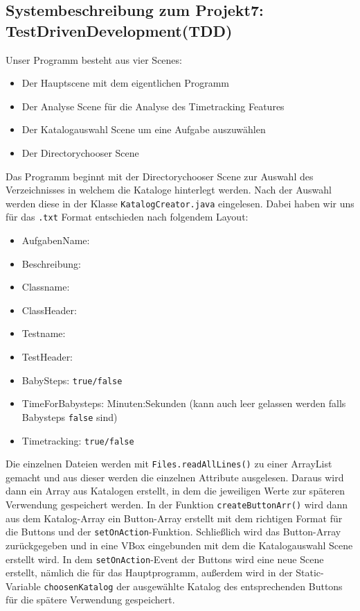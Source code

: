 \documentclass[10pt]{article}
\begin{document}
\begin{center}

\section*{Systembeschreibung zum Projekt7: TestDrivenDevelopment(TDD)}

\end{center}
\bigskip
Unser Programm besteht aus vier Scenes:
\medskip
\begin{itemize}

\item Der Hauptscene mit dem eigentlichen Programm
\item Der Analyse Scene für die Analyse des Timetracking Features
\item Der Katalogauswahl Scene um eine Aufgabe auszuwählen
\item Der Directorychooser Scene

\end{itemize}
\medskip
Das Programm beginnt mit der Directorychooser Scene zur Auswahl des Verzeichnisses in welchem die Kataloge hinterlegt werden. Nach der Auswahl werden diese in der Klasse \verb+KatalogCreator.java+ eingelesen. Dabei haben wir uns für das \verb+.txt+ Format entschieden nach folgendem Layout:
\begin{itemize}

\item[] AufgabenName:

\item[] Beschreibung:

\item[] Classname:

\item[] ClassHeader:

\item[] Testname:

\item[] TestHeader:

\item[]BabySteps: \verb+true/false+
\item[] TimeForBabysteps: Minuten:Sekunden (kann auch leer gelassen werden falls Babysteps \verb+false+ sind)
\item[] Timetracking: \verb+true/false+
\end{itemize}
\medskip
Die einzelnen Dateien werden mit \verb+Files.readAllLines()+ zu einer ArrayList gemacht und aus dieser werden die einzelnen Attribute ausgelesen. Daraus wird dann ein Array aus Katalogen erstellt, in dem die jeweiligen Werte zur späteren Verwendung gespeichert werden. In der Funktion \verb+createButtonArr()+ wird dann aus dem Katalog-Array ein Button-Array erstellt mit dem richtigen Format für die Buttons und der \verb+setOnAction+-Funktion. Schließlich wird das Button-Array zurückgegeben und in eine VBox eingebunden mit dem die Katalogauswahl Scene erstellt wird. In dem \verb+setOnAction+-Event der Buttons wird eine neue Scene erstellt, nämlich die für das Hauptprogramm, außerdem wird in der Static-Variable \verb+choosenKatalog+ der ausgewählte Katalog des entsprechenden Buttons für die spätere Verwendung gespeichert.
\end{document}
